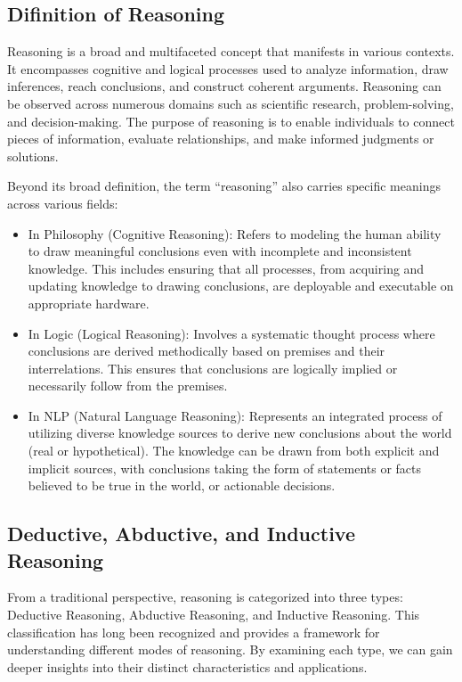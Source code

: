 \subsection{Difinition of Reasoning}

Reasoning is a broad and multifaceted concept that manifests in various contexts. 
It encompasses cognitive and logical processes used to analyze information, draw 
inferences, reach conclusions, and construct coherent arguments. Reasoning can be 
observed across numerous domains such as scientific research, problem-solving, and 
decision-making. The purpose of reasoning is to enable individuals to connect pieces 
of information, evaluate relationships, and make informed judgments or solutions. 

Beyond its broad definition, the term “reasoning” also carries specific meanings across various fields:
\begin{itemize}
    \item In Philosophy (Cognitive Reasoning): Refers to modeling the human ability to draw meaningful conclusions even with incomplete and inconsistent knowledge. This includes ensuring that all processes, from acquiring and updating knowledge to drawing conclusions, are deployable and executable on appropriate hardware. \cite{back1}
    \item In Logic (Logical Reasoning): Involves a systematic thought process where conclusions are derived methodically based on premises and their interrelations. This ensures that conclusions are logically implied or necessarily follow from the premises. \cite{back2}
    \item In NLP (Natural Language Reasoning): Represents an integrated process of utilizing diverse knowledge sources to derive new conclusions about the world (real or hypothetical). The knowledge can be drawn from both explicit and implicit sources, with conclusions taking the form of statements or facts believed to be true in the world, or actionable decisions. \cite{back3}
\end{itemize}

\subsection{Deductive, Abductive, and Inductive Reasoning}

From a traditional perspective, reasoning is categorized into three types: Deductive Reasoning, Abductive Reasoning, and Inductive Reasoning. This classification has long been recognized and provides a framework for understanding different modes of reasoning. By examining each type, we can gain deeper insights into their distinct characteristics and applications.

